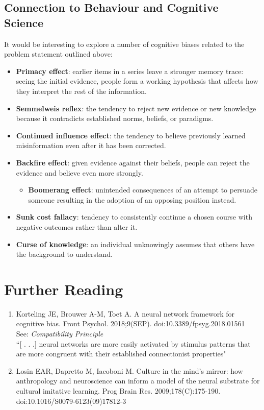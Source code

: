 \documentclass[12pt]{amsart}
\begin{document}
\subsection{Connection to Behaviour and Cognitive Science}
It would be interesting to explore a number of cognitive biases related to the problem statement outlined above: 
\begin{itemize}
\item {\bf Primacy effect}: earlier items in a series leave a stronger memory trace: seeing the initial evidence, people form a working hypothesis that affects how they interpret the rest of the information.
\item {\bf Semmelweis reflex}: the tendency to reject new evidence or new knowledge because it contradicts established norms, beliefs, or paradigms.
\item {\bf Continued influence effect}: the tendency to believe previously learned misinformation even after it has been corrected.
\item {\bf Backfire effect}: given evidence against their beliefs, people can reject the evidence and believe even more strongly.
\begin{itemize}
\item {\bf Boomerang effect}: unintended consequences of an attempt to persuade someone resulting in the adoption of an opposing position instead. \end{itemize}
\item {\bf Sunk cost fallacy}: tendency to consistently continue a chosen course with negative outcomes rather than alter it.
\item {\bf Curse of knowledge}: an individual unknowingly assumes that others have the background to understand.

\end{itemize}
\section{Further Reading}
\begin{enumerate}
\item Korteling JE, Brouwer A-M, Toet A. A neural network framework for cognitive bias. Front Psychol. 2018;9(SEP). doi:10.3389/fpsyg.2018.01561 \\ See: {\it Compatibility Principle} \\``[ . . .] neural networks are more easily activated by stimulus patterns that are more congruent with their established connectionist properties" \\
\item Losin EAR, Dapretto M, Iacoboni M. Culture in the mind’s mirror: how anthropology and neuroscience can inform a model of the neural substrate for cultural imitative learning. Prog Brain Res. 2009;178(C):175-190. doi:10.1016/S0079-6123(09)17812-3
\end{enumerate} 
\end{document}
